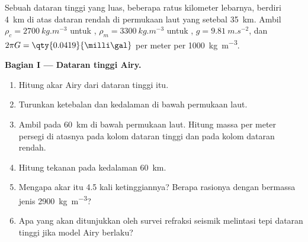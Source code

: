 \begin{problem}
\label{pb:b1:isostasy-gravity:1}
Sebuah dataran tinggi yang luas, beberapa ratus kilometer lebarnya, berdiri \qty{4}{km} di atas dataran rendah di permukaan laut yang  setebal \qty{35}{km}. Ambil $\rho_c = \qty{2700}{kg.m^{-3}}$ untuk , $\rho_m = \qty{3300}{kg.m^{-3}}$ untuk , $g = \qty{9.81}{m.s^{-2}}$, dan $2\pi G = \qty{0.0419}{\milli\gal}$ per meter per \qty{1000}{kg.m^{-3}}.

\medskip
\noindent\textbf{Bagian I --- Dataran tinggi Airy.}
\begin{enumerate}
  \item Hitung akar Airy dari dataran tinggi itu.
  \item Turunkan ketebalan  dan kedalaman  di bawah permukaan laut.
  \item Ambil  pada \qty{60}{km} di bawah permukaan laut. Hitung massa per meter persegi di atasnya pada kolom dataran tinggi dan pada kolom dataran rendah.
  \item Hitung tekanan pada kedalaman \qty{60}{km}.
  \item Mengapa akar itu 4.5 kali ketinggiannya? Berapa rasionya dengan  bermassa jenis \qty{2900}{kg.m^{-3}}?
  \item Apa yang akan ditunjukkan oleh survei refraksi seismik melintasi tepi dataran tinggi jika model Airy berlaku?
\end{enumerate}


\end{problem}
